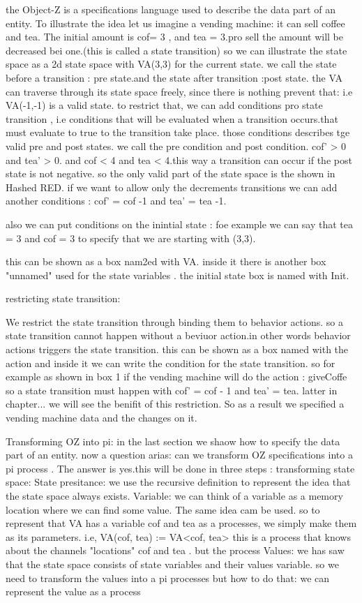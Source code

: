 the Object-Z is a specifications language used to describe the data part of an entity. To illustrate the idea let us imagine a vending machine: it can sell coffee and tea. The initial amount is cof= 3 , and tea  = 3.pro sell the amount will be decreased bei one.(this is called a state transition)
so we can illustrate the state space as a 2d state space with VA(3,3) for the current state. we call the state before a transition : pre state.and the state after transition :post state. the VA can traverse through its state space freely, since there is nothing prevent that: i.e VA(-1,-1) is a valid state. to restrict that, we can add conditions pro state transition , i.e conditions that will be evaluated when a transition occurs.that must evaluate to true to the transition take place. those conditions describes tge valid pre and post states. we call the pre condition and post condition. cof' > 0 and tea' > 0. and cof < 4 and tea < 4.this way a transition can occur if the post state is not negative. so the only valid part of the state space is the shown in Hashed RED. if we want to allow only the decrements transitions we can add another conditions : cof' = cof -1 and tea' = tea -1.

also we can put conditions on the inintial state : foe example we can say that tea = 3 and cof = 3 to specify that we are starting with (3,3).

this can be shown as a box nam2ed with VA. inside it there is another box "unnamed" used for the state variables .
the initial state box is named with Init.

restricting state transition:

We restrict the state transition through binding them to behavior actions. so a state transition cannot happen without a beviuor action.in other words behavior actions triggers the state transition.
this can be shown as a box named with the action and inside it we can write the condition for the state transition.
so for example as shown in box 1 if the vending machine will do the action : giveCoffe so a state transition must happen with cof' = cof - 1 and tea' = tea.
latter in chapter... we will see the benifit of this restriction. So as a result we specified a vending machine data and the changes on it.

Transforming OZ into pi:
in the last section we shaow how to specify the data part of an entity. now a question arias: can we transform OZ specifications into a pi process . The answer is yes.this will be done in three steps :
transforming state space:
State presitance: we use the recursive definition to represent the idea that the state space always exists.
Variable: we can think of a variable as a memory location where we can find some value. The same idea cam be used. so to represent that VA has a variable cof and tea  as a processes, we simply make them as its parameters. i.e, VA(cof, tea) := VA<cof, tea> this is a process that knows about the channels "locations" cof and tea . but the process
Values: we has saw that the state space consists  of state variables and their values variable. so we need to transform the values into a pi processes but how to do that:
we can represent the value as a process 




\newpage %
